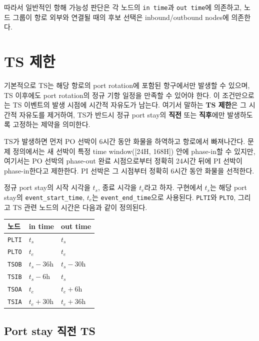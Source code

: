 \documentclass[11pt]{article}
\begin{document}
따라서 일반적인 항해 가능성 판단은 각 노드의 \texttt{in time}과 \texttt{out time}에
의존하고, 노드 그룹이 항로 외부와 연결될 때의 후보 선택은 inbound/outbound nodes에
의존한다.

\section{TS 제한}

기본적으로 TS는 해당 항로의 port rotation에 포함된 항구에서만 발생할 수 있으며,
TS 이후에도 port rotation의 정규 기항 일정을 만족할 수 있어야 한다. 이 조건만으로는
TS 이벤트의 발생 시점에 시간적 자유도가 남는다. 여기서 말하는 \textbf{TS 제한}은
그 시간적 자유도를 제거하여, TS가 반드시 정규 port stay의 \textbf{직전} 또는
\textbf{직후}에만 발생하도록 고정하는 제약을 의미한다.

TS가 발생하면 먼저 PO 선박이 6시간 동안 화물을 하역하고 항로에서
빠져나간다. 문제 정의에서는 새 선박이 특정 time window([24H, 168H]) 안에 phase-in할 수
있지만, 여기서는 PO 선박의 phase-out 완료 시점으로부터 정확히 24시간 뒤에
PI 선박이 phase-in한다고 제한한다. PI 선박은 그 시점부터 정확히 6시간 동안
화물을 선적한다.

정규 port stay의 시작 시각을 $t_s$, 종료 시각을 $t_e$라고 하자. 구현에서
$t_s$는 해당 port stay의 \texttt{event\_start\_time}, $t_e$는
\texttt{event\_end\_time}으로 사용된다. \texttt{PLTI}와 \texttt{PLTO}, 그리고
TS 관련 노드의 시간은 다음과 같이 정의된다.

\begin{center}
\begin{tabular}{@{}lll@{}}
\toprule
노드 & in time & out time \\
\midrule
\texttt{PLTI} & $t_s$ & $t_s$ \\
\texttt{PLTO} & $t_e$ & $t_e$ \\
\texttt{TSOB} & $t_s-36\mathrm{h}$ & $t_s-30\mathrm{h}$ \\
\texttt{TSIB} & $t_s-6\mathrm{h}$ & $t_s$ \\
\texttt{TSOA} & $t_e$ & $t_e+6\mathrm{h}$ \\
\texttt{TSIA} & $t_e+30\mathrm{h}$ & $t_e+36\mathrm{h}$ \\
\bottomrule
\end{tabular}
\end{center}

\subsection{Port stay 직전 TS}
\end{document}
